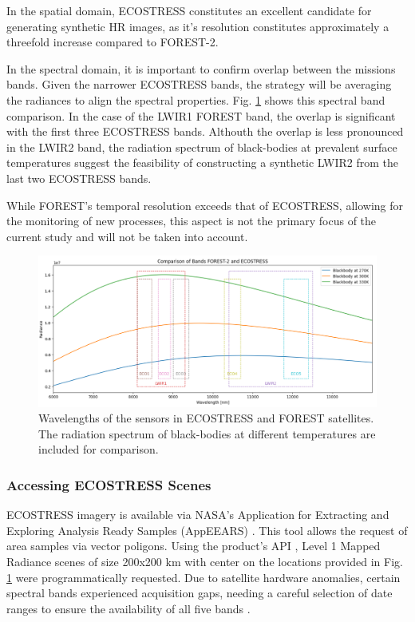 In the spatial domain, ECOSTRESS constitutes an excellent candidate for generating synthetic HR images, as it's resolution constitutes approximately a threefold increase compared to FOREST-2. 

In the spectral domain, it is important to confirm overlap between the missions bands. Given the narrower ECOSTRESS bands, the strategy will be averaging the radiances to align the spectral properties.
Fig. \ref{fig:5-wavelength-comparison} shows this spectral band comparison.
In the case of the LWIR1 FOREST band, the overlap is significant with the first three ECOSTRESS bands.
Althouth the overlap is less pronounced in the LWIR2 band, the radiation spectrum of black-bodies at prevalent surface temperatures suggest the feasibility of constructing a synthetic LWIR2 from the last two ECOSTRESS bands.

While FOREST's temporal resolution exceeds that of ECOSTRESS, allowing for the monitoring of new processes, this aspect is not the primary focus of the current study and will not be taken into account.



\begin{figure}[H]
    \centering
    \includegraphics[width=\linewidth]{Includes/5-wavelength-comparison.png}
    \caption{Wavelengths of the sensors in ECOSTRESS and FOREST satellites. The radiation spectrum of black-bodies at different temperatures are included for comparison.}
    \label{fig:5-wavelength-comparison}
\end{figure}

\subsubsection{Accessing ECOSTRESS Scenes}
    ECOSTRESS imagery is available via NASA's Application for Extracting and Exploring Analysis Ready Samples (AppEEARS) \cite{AppEEARS2023}. This tool allows the request of area samples via vector poligons. Using the product's API \cite{AppEEARSAPI2023}, Level 1 Mapped Radiance scenes of size 200x200 km  with center on the locations provided in Fig. \ref{fig:5-wavelength-comparison} were programmatically requested. Due to satellite hardware anomalies, certain spectral bands experienced acquisition gaps, needing a careful selection of date ranges to ensure the availability of all five bands \cite{ECO1BMAPRAD2023}.

